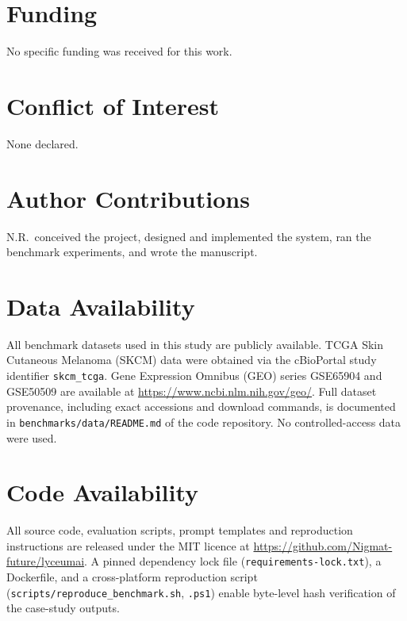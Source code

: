 \documentclass[11pt]{article}
\begin{document}
\section*{Funding}
No specific funding was received for this work.

\section*{Conflict of Interest}
None declared.

\section*{Author Contributions}
N.R.\ conceived the project, designed and implemented the system,
ran the benchmark experiments, and wrote the manuscript.

\section*{Data Availability}
All benchmark datasets used in this study are publicly available.
TCGA Skin Cutaneous Melanoma (SKCM) data were obtained via the cBioPortal
study identifier \texttt{skcm\_tcga}.
Gene Expression Omnibus (GEO) series GSE65904 and GSE50509 are available at
\url{https://www.ncbi.nlm.nih.gov/geo/}.
Full dataset provenance, including exact accessions and download commands,
is documented in \texttt{benchmarks/data/README.md} of the code repository.
No controlled-access data were used.

\section*{Code Availability}
All source code, evaluation scripts, prompt templates and reproduction
instructions are released under the MIT licence at
\url{https://github.com/Nigmat-future/lyceumai}.
A pinned dependency lock file
(\texttt{requirements-lock.txt}), a Dockerfile, and a cross-platform
reproduction script (\texttt{scripts/reproduce\_benchmark.sh},
\texttt{.ps1}) enable byte-level hash verification of the case-study
outputs.



\end{document}

